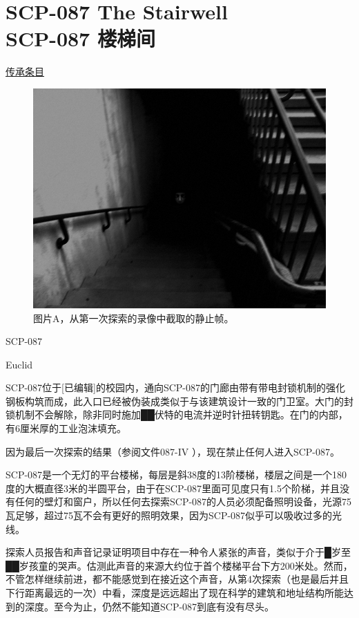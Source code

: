 \chapter[SCP-087 楼梯间]{
    SCP-087 The Stairwell\\
    SCP-087 楼梯间
}

\label{chap:SCP-087}

\hyperref[chap:CENTER-heritage]{ 传承条目}

\begin{figure}[H]
    \centering
    \includegraphics[width=0.5\linewidth]{images/SCP.087.png}
    \caption*{图片A，从第一次探索的录像中截取的静止帧。}
\end{figure}

SCP-087

Euclid

SCP-087位于{[}已编辑]的校园内，通向SCP-087的门廊由带有带电封锁机制的强化钢板构筑而成，此入口已经被伪装成类似于与该建筑设计一致的门卫室。大门的封锁机制不会解除，除非同时施加██伏特的电流并逆时针扭转钥匙。在门的内部，有6厘米厚的工业泡沫填充。

因为最后一次探索的结果（参阅文件087-IV ），现在禁止任何人进入SCP-087。

 SCP-087是一个无灯的平台楼梯，每层是斜38度的13阶楼梯，楼层之间是一个180度的大概直径3米的半圆平台，由于在SCP-087里面可见度只有1.5个阶梯，并且没有任何的壁灯和窗户，所以任何去探索SCP-087的人员必须配备照明设备，光源75瓦足够，超过75瓦不会有更好的照明效果，因为SCP-087似乎可以吸收过多的光线。

探索人员报告和声音记录证明项目中存在一种令人紧张的声音，类似于介于█岁至██岁孩童的哭声。估测此声音的来源大约位于首个楼梯平台下方200米处。然而，不管怎样继续前进，都不能感觉到在接近这个声音，从第4次探索（也是最后并且下行距离最远的一次）中看，深度是远远超出了现在科学的建筑和地址结构所能达到的深度。至今为止，仍然不能知道SCP-087到底有没有尽头。

